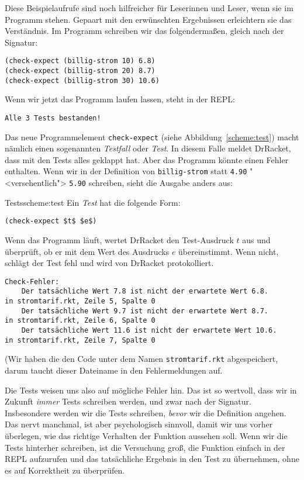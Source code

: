 Diese Beispielaufrufe sind noch hilfreicher für Leserinnen und Leser,
wenn sie im Programm stehen.  Gepaart mit den erwünschten Ergebnissen
erleichtern sie das Verständnis.  Im Programm schreiben wir
das folgendermaßen, gleich nach der Signatur:
%
\begin{lstlisting}
(check-expect (billig-strom 10) 6.8)
(check-expect (billig-strom 20) 8.7)
(check-expect (billig-strom 30) 10.6)
\end{lstlisting}
%
Wenn wir jetzt das Programm laufen lassen, steht in der REPL:
%
\begin{verbatim}
Alle 3 Tests bestanden!
\end{verbatim}
%
Das neue Programmelement
\lstinline{check-expect} (siehe
Abbildung~\ref{scheme:test}) macht
nämlich einen sogenannten \textit{Testfall} oder \textit{Test}.  In diesem Falle
meldet DrRacket, dass mit den Tests alles geklappt hat.  Aber das
Programm könnte einen Fehler enthalten.  Wenn wir in der Definition
von \lstinline{billig-strom} statt \lstinline{4.90} "<versehentlich">
\lstinline{5.90} schreiben, sieht die Ausgabe anders aus:
%
\begin{feature}{Tests}{scheme:test}
  Ein \textit{Test} hat die folgende Form:
\begin{lstlisting}
(check-expect $t$ $e$)
\end{lstlisting}
%
Wenn das Programm läuft, wertet DrRacket den Test-Ausdruck $t$ aus und
überprüft, ob er mit dem Wert des Ausdrucks $e$ übereinstimmt.  Wenn
nicht, schlägt der Test fehl und wird von DrRacket protokolliert.
\end{feature}
%
\begin{verbatim}
Check-Fehler:
	Der tatsächliche Wert 7.8 ist nicht der erwartete Wert 6.8.
in stromtarif.rkt, Zeile 5, Spalte 0 
	Der tatsächliche Wert 9.7 ist nicht der erwartete Wert 8.7.
in stromtarif.rkt, Zeile 6, Spalte 0 
	Der tatsächliche Wert 11.6 ist nicht der erwartete Wert 10.6.
in stromtarif.rkt, Zeile 7, Spalte 0 
\end{verbatim}
%
(Wir haben die den Code unter dem Namen \texttt{stromtarif.rkt}
abgespeichert, darum taucht dieser Dateiname in den Fehlermeldungen auf.

Die Tests weisen uns also auf mögliche Fehler hin.  Das ist so
wertvoll, dass wir in Zukunft \emph{immer} Tests schreiben werden, und
zwar nach der Signatur.  Insbesondere werden wir die Tests schreiben,
\emph{bevor} wir die Definition angehen.  Das nervt manchmal, ist aber
psychologisch sinnvoll, damit wir uns vorher überlegen, wie das
richtige Verhalten der Funktion aussehen soll.  Wenn wir die Tests
hinterher schreiben, ist die Versuchung groß, die Funktion einfach in
der REPL aufzurufen und das tatsächliche Ergebnis in den Test zu
übernehmen, ohne es auf Korrektheit zu überprüfen.


